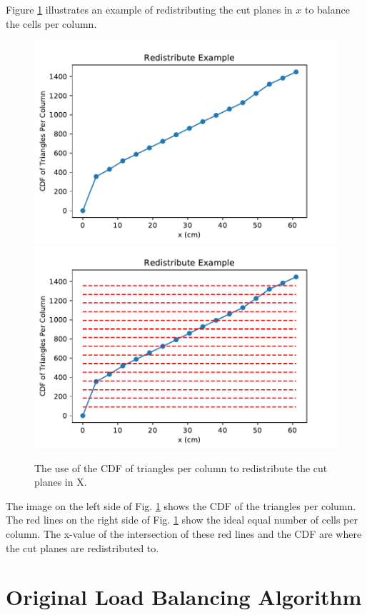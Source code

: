 Figure \ref{redistribute} illustrates an example of redistributing the cut planes in $x$ to balance the cells per column.
\begin{figure}[H]
\centering
\includegraphics[scale=0.4]{Figures/redistribute_before.pdf}
\includegraphics[scale=0.4]{Figures/redistribute_after.pdf}
\caption{The use of the CDF of triangles per column to redistribute the cut planes in X.}
\label{redistribute}
\end{figure}
The image on the left side of Fig. \ref{redistribute} shows the CDF of the triangles per column. The red lines on the right side of Fig. \ref{redistribute} show the ideal equal number of cells per column. The x-value of the intersection of these red lines and the CDF are where the cut planes are redistributed to. 
 
\section{Original Load Balancing Algorithm}

